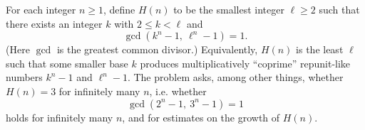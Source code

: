 For each integer $n\ge1$, define $H(n)$ to be the smallest integer $\ell\ge2$ such that there exists an integer $k$ with $2\le k<\ell$ and
\[
\gcd(k^n-1,\ \ell^n-1)=1.
\]
(Here $\gcd$ is the greatest common divisor.)
Equivalently, $H(n)$ is the least $\ell$ such that some smaller base $k$ produces multiplicatively ``coprime'' repunit-like numbers $k^n-1$ and $\ell^n-1$.
The problem asks, among other things, whether $H(n)=3$ for infinitely many $n$, i.e. whether
\[
\gcd(2^n-1,\ 3^n-1)=1
\]
holds for infinitely many $n$, and for estimates on the growth of $H(n)$.
